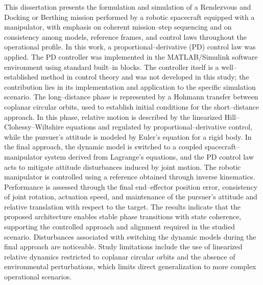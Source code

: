 This dissertation presents the formulation and simulation of a Rendezvous and Docking or Berthing mission performed by a robotic spacecraft equipped with a manipulator, with emphasis on coherent mission--step sequencing and on consistency among models, reference frames, and control laws throughout the operational profile.
In this work, a proportional--derivative (PD) control law was applied. The PD controller was implemented in the MATLAB/Simulink software environment using standard built--in blocks. The controller itself is a well--established method in control theory and was not developed in this study; the contribution lies in its implementation and application to the specific simulation scenario.
The long--distance phase is represented by a Hohmann transfer between coplanar circular orbits, used to establish initial conditions for the short--distance approach. 
In this phase, relative motion is described by the linearized Hill--Clohessy--Wiltshire equations and regulated by proportional--derivative control, while the pursuer's attitude is modeled by Euler's equation for a rigid body.
In the final approach, the dynamic model is switched to a coupled spacecraft--manipulator system derived from Lagrange's equations, and the PD control law acts to mitigate attitude disturbances induced by joint motion. The robotic manipulator is controlled using a reference obtained through inverse kinematics.
Performance is assessed through the final end--effector position error, consistency of joint rotation, actuation speed, and maintenance of the pursuer's attitude and relative translation with respect to the target. The results indicate that the proposed architecture enables stable phase transitions with state coherence, supporting the controlled approach and alignment required in the studied scenario. Disturbances associated with switching the dynamic models during the final approach are noticeable.
Study limitations include the use of linearized relative dynamics restricted to coplanar circular orbits and the absence of environmental perturbations, which limits direct generalization to more complex operational scenarios.